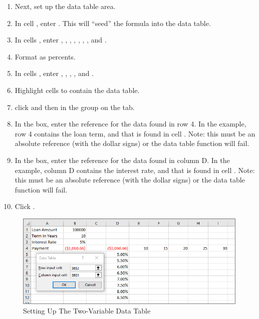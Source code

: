 \begin{enumerate}
	\item Next, set up the data table area.
	\item In cell , enter . This will ``seed'' the  formula into the data table.
	\item In cells , enter , , , , , , , and .
	\item Format  as percents.
	\item In cells , enter , , , , and .
	\item Highlight cells  to contain the data table.
	\item click  and then  in the  group on the  tab.
	\item In the  box, enter the reference for the data found in row 4. In the example, row 4 contains the loan term, and that is found in cell . Note: this must be an absolute reference (with the dollar signs) or the data table function will fail.
	\item In the  box, enter the reference for the data found in column D. In the example, column D contains the interest rate, and that is found in cell . Note: this must be an absolute reference (with the dollar signs) or the data table function will fail.
	\item Click .
\end{enumerate}

\begin{figure}[H]
	\centering
	\includegraphics[width=\maxwidth{.95\linewidth}]{gfx/ch08_fig21}
	\caption{Setting Up The Two-Variable Data Table}
	\label{08:fig21}
\end{figure}

